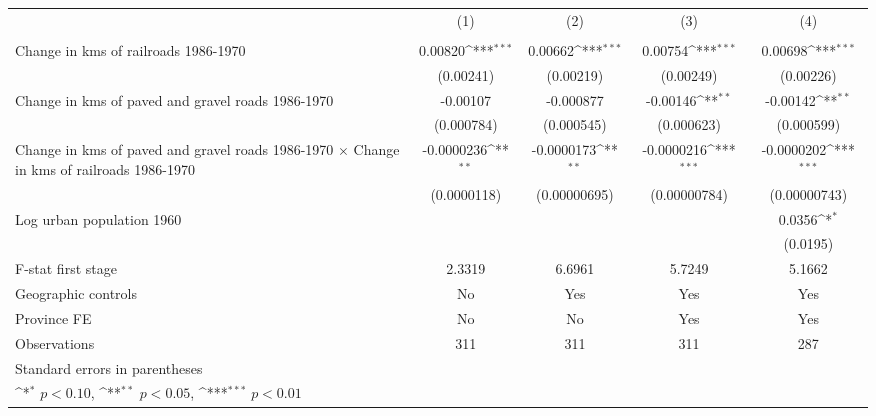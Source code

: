 {
\def\sym#1{\ifmmode^{#1}\else\(^{#1}\)\fi}
\begin{tabular}{l*{4}{c}}
\hline\hline
                &\multicolumn{1}{c}{(1)}&\multicolumn{1}{c}{(2)}&\multicolumn{1}{c}{(3)}&\multicolumn{1}{c}{(4)}\\
                &\multicolumn{1}{c}{}&\multicolumn{1}{c}{}&\multicolumn{1}{c}{}&\multicolumn{1}{c}{}\\
\hline
Change in kms of railroads 1986-1970&  0.00820\sym{***}&  0.00662\sym{***}&  0.00754\sym{***}&  0.00698\sym{***}\\
                &(0.00241)         &(0.00219)         &(0.00249)         &(0.00226)         \\
[1em]
Change in kms of paved and gravel roads 1986-1970& -0.00107         &-0.000877         & -0.00146\sym{**} & -0.00142\sym{**} \\
                &(0.000784)         &(0.000545)         &(0.000623)         &(0.000599)         \\
[1em]
Change in kms of paved and gravel roads 1986-1970 $\times$ Change in kms of railroads 1986-1970&-0.0000236\sym{**} &-0.0000173\sym{**} &-0.0000216\sym{***}&-0.0000202\sym{***}\\
                &(0.0000118)         &(0.00000695)         &(0.00000784)         &(0.00000743)         \\
[1em]
Log urban population 1960&                  &                  &                  &   0.0356\sym{*}  \\
                &                  &                  &                  & (0.0195)         \\
\hline
F-stat first stage&   2.3319         &   6.6961         &   5.7249         &   5.1662         \\
Geographic controls&       No         &      Yes         &      Yes         &      Yes         \\
Province FE     &       No         &       No         &      Yes         &      Yes         \\
Observations    &      311         &      311         &      311         &      287         \\
\hline\hline
\multicolumn{5}{l}{\footnotesize Standard errors in parentheses}\\
\multicolumn{5}{l}{\footnotesize \sym{*} \(p<0.10\), \sym{**} \(p<0.05\), \sym{***} \(p<0.01\)}\\
\end{tabular}
}
